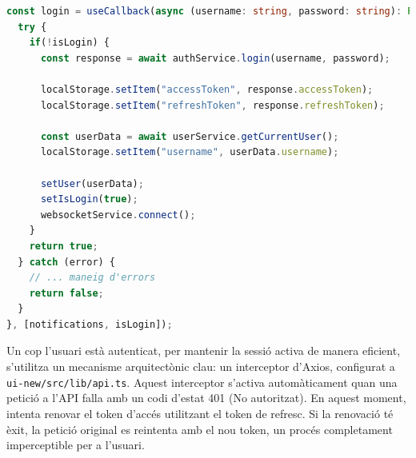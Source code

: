\begin{lstlisting}[language=typescript, caption={Fragment de la funció `login` al hook `userAuth.tsx`}]
const login = useCallback(async (username: string, password: string): Promise<boolean> => {
  try {
    if(!isLogin) {
      const response = await authService.login(username, password);
      
      localStorage.setItem("accessToken", response.accessToken);
      localStorage.setItem("refreshToken", response.refreshToken);
      
      const userData = await userService.getCurrentUser();
      localStorage.setItem("username", userData.username);

      setUser(userData);
      setIsLogin(true);
      websocketService.connect();
    }
    return true;
  } catch (error) {
    // ... maneig d'errors
    return false;
  }
}, [notifications, isLogin]);
\end{lstlisting}

Un cop l'usuari està autenticat, per mantenir la sessió activa de manera eficient, s'utilitza un mecanisme arquitectònic clau: un interceptor d'Axios, configurat a \texttt{ui-new/src/lib/api.ts}. Aquest interceptor s'activa automàticament quan una petició a l'API falla amb un codi d'estat 401 (No autoritzat). En aquest moment, intenta renovar el token d'accés utilitzant el token de refresc. Si la renovació té èxit, la petició original es reintenta amb el nou token, un procés completament imperceptible per a l'usuari.


